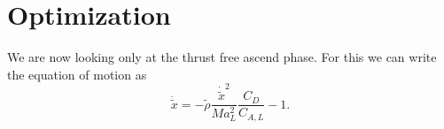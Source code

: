 \section{Optimization}
We are now looking only at the thrust free ascend phase.
For this we can write the equation of motion as
\begin{equation}
	\ddot{\tilde{x}} =  - \tilde{\rho} \frac{\dot{\tilde{x}}^2}{Ma_L^2} \frac{C_D}{C_{A, L}}  - 1.
\end{equation}